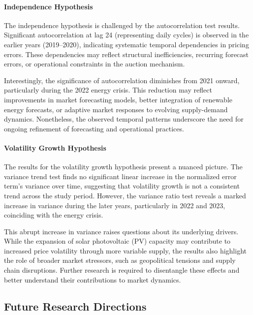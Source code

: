 \documentclass[12pt]{article}
\begin{document}
\paragraph{Independence Hypothesis}

The independence hypothesis is challenged by the autocorrelation test results. Significant autocorrelation at lag 24 (representing daily cycles) is observed in the earlier years (2019–2020), indicating systematic temporal dependencies in pricing errors. These dependencies may reflect structural inefficiencies, recurring forecast errors, or operational constraints in the auction mechanism.

Interestingly, the significance of autocorrelation diminishes from 2021 onward, particularly during the 2022 energy crisis. This reduction may reflect improvements in market forecasting models, better integration of renewable energy forecasts, or adaptive market responses to evolving supply-demand dynamics. Nonetheless, the observed temporal patterns underscore the need for ongoing refinement of forecasting and operational practices.

\paragraph{Volatility Growth Hypothesis}

The results for the volatility growth hypothesis present a nuanced picture. The variance trend test finds no significant linear increase in the normalized error term's variance over time, suggesting that volatility growth is not a consistent trend across the study period. However, the variance ratio test reveals a marked increase in variance during the later years, particularly in 2022 and 2023, coinciding with the energy crisis.

This abrupt increase in variance raises questions about its underlying drivers. While the expansion of solar photovoltaic (PV) capacity may contribute to increased price volatility through more variable supply, the results also highlight the role of broader market stressors, such as geopolitical tensions and supply chain disruptions. Further research is required to disentangle these effects and better understand their contributions to market dynamics.

\subsection{Future Research Directions}
\end{document}
